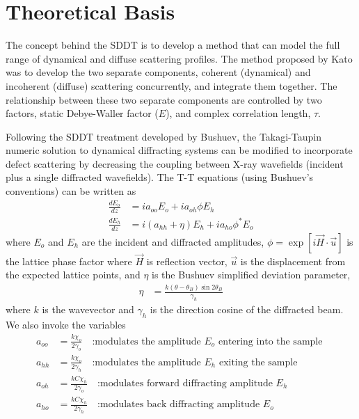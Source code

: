 	\section{Theoretical Basis}

The concept behind the SDDT is to develop a method that can model the full range of dynamical and diffuse scattering profiles.  The method proposed by Kato was to develop the two separate components, coherent (dynamical) and incoherent (diffuse) scattering concurrently, and integrate them together.  The relationship between these two separate components are controlled by two factors, static Debye-Waller factor ($E$), and complex correlation length, $\tau$.  

Following the SDDT treatment developed by Bushuev, the Takagi-Taupin numeric solution to dynamical diffracting systems can be modified to incorporate defect scattering by decreasing the coupling between X-ray wavefields (incident plus a single diffracted wavefields).  The T-T equations (using Bushuev's conventions) can be written as
\begin{align}
\frac{dE_o}{dz} &= i a_{oo} E_o + ia_{oh} \phi E_h\\
\frac{dE_h}{dz} &= i(a_{hh}+\eta)E_h +i a_{ho}\phi^* E_o
\end{align}
where $E_o$ and $E_h$ are the incident and diffracted amplitudes, $\phi=\exp [i \vec{H} \cdot \vec{u}]$ is the lattice phase factor \cite{KatoI,Authier1} where $\vec{H}$ is reflection vector, $\vec{u}$ is the displacement from the expected lattice points, and $\eta$ is the Bushuev simplified deviation parameter, 
\begin{align}
\eta &= \frac{k (\theta -\theta_B) \sin 2 \theta_B}{\gamma_h}
\end{align}
where $k$ is the wavevector and $\gamma_h$ is the direction cosine of the diffracted beam. We also invoke the variables
\begin{align}
a_{oo} &= \frac{k  \chi_o}{2 \gamma_o} \quad  \text{:modulates the amplitude $E_o$ entering into the sample }\\
a_{hh} &= \frac{k  \chi_o}{2 \gamma_h}\quad  \text{:modulates the amplitude $E_h$ exiting the sample }\\
a_{oh} &= \frac{k C \chi_{\overline{h}}}{2 \gamma_o}\quad \text{:modulates forward diffracting amplitude $E_h$}\\
a_{ho} &= \frac{k C \chi_h}{2 \gamma_h} \quad \text{:modulates back diffracting amplitude $E_o$}
\end{align}

